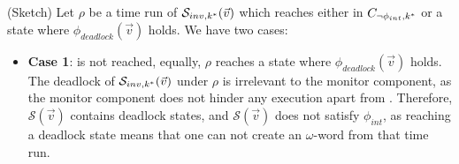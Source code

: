 \proof (Sketch) Let $\rho$ be a time run of
$\mathcal{S}_{inv,k^*}(\vec{v})$ which reaches either  in
$C_{\neg\phi_{int},k^*}$ or a state where $\phi_{deadlock}(\vec{v})$
holds. We have two cases:
\begin{itemize}
\item \textbf{Case 1}:  is not reached, equally, $\rho$ reaches a state where $\phi_{deadlock}(\vec{v})$ holds. The deadlock of $\mathcal{S}_{inv,k^*}(\vec{v})$ under $\rho$ is irrelevant to the monitor component, as the monitor component does not hinder any execution apart from .  Therefore, $\mathcal{S}(\vec{v})$ contains deadlock states, and 
 $\mathcal{S}(\vec{v})$ does not satisfy $\phi_{int}$, as reaching a deadlock state means that one can not create an  $\omega$-word from that time run. 
	







\end{itemize}
